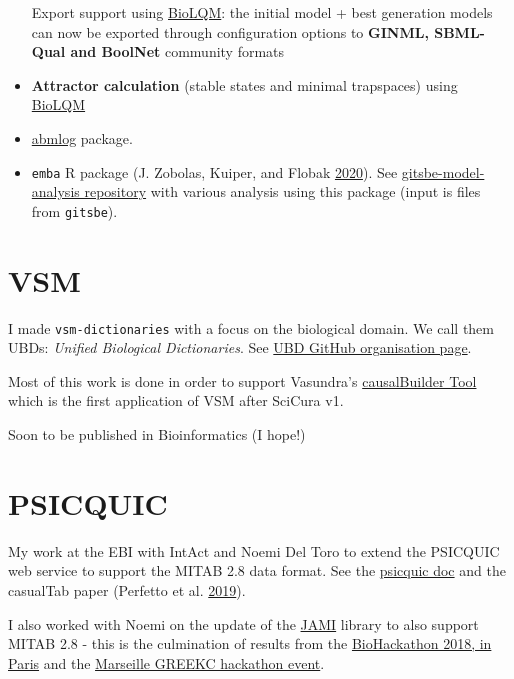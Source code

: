 \documentclass[
  12pt,
]{book}
\begin{document}
\begin{itemize}
  Export support using \href{https://github.com/colomoto/bioLQM}{BioLQM}: the initial model + best generation models can now be exported through configuration options to \textbf{GINML, SBML-Qual and BoolNet} community formats
\item
  \textbf{Attractor calculation} (stable states and minimal trapspaces) using \href{https://github.com/colomoto/bioLQM}{BioLQM}
\item
  \href{https://github.com/druglogics/abmlog}{abmlog} package.
\item
  \texttt{emba} R package (J. Zobolas, Kuiper, and Flobak \protect\hyperlink{ref-Zobolas2020}{2020}).
  See \href{https://github.com/bblodfon/gitsbe-model-analysis/}{gitsbe-model-analysis repository} with various analysis using this package (input is files from \texttt{gitsbe}).
\end{itemize}

\hypertarget{vsm}{%
\section*{VSM}\label{vsm}}

I made \texttt{vsm-dictionaries} with a focus on the biological domain.
We call them UBDs: \emph{Unified Biological Dictionaries}.
See \href{https://github.com/UniBioDicts}{UBD GitHub organisation page}.

Most of this work is done in order to support Vasundra's \href{https://mi2cast.github.io/causalBuilder/}{causalBuilder Tool} which is the first application of VSM after SciCura v1.

Soon to be published in Bioinformatics (I hope!)

\hypertarget{psicquic}{%
\section*{PSICQUIC}\label{psicquic}}

My work at the EBI with IntAct and Noemi Del Toro to extend the PSICQUIC web service to support the
MITAB 2.8 data format.
See the \href{http://psicquic.github.io/MITAB28Format.html}{psicquic doc} and the casualTab paper (Perfetto et al. \protect\hyperlink{ref-Perfetto2019}{2019}).

I also worked with Noemi on the update of the \href{https://github.com/MICommunity/psi-jami}{JAMI}
library to also support MITAB 2.8 - this is the culmination of results from the
\href{https://2018.biohackathon-europe.org/}{BioHackathon 2018, in Paris} and the
\href{https://github.com/GREEKC/hackathon-marseille/tree/master/project_descriptions/causal_psicquic}{Marseille GREEKC hackathon event}.
\end{document}
